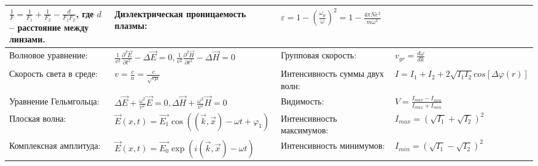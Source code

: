 \documentclass{article}
\begin{document}
\begin{tabular}{ |p{4.1cm}|p{5.4cm}|p{3.9cm}|p{5.6cm}|  }
$\frac{1}{F} = \frac{1}{F_1} + \frac{1}{F_2} - \frac{d}{F_1 F_2}$,
где $d$ -- расстояние между линзами.                                         &  %
Диэлектрическая проницаемость плазмы:                                        &  %
$\varepsilon = 1 - (\frac{\omega_p}{\omega})^2 =
 1 - \frac{4 \pi N e^2}{m \omega^2}$                                         \\ %
\hline
Волновое уравнение:                                                          &  %
$\frac{1}{v^2} \frac{\partial^2 \vec{E}}{\partial t^2} - \Delta \vec{E} = 0,
\frac{1}{v^2} \frac{\partial^2 \vec{H}}{\partial t^2} - \Delta \vec{H} = 0$  &  %
Групповая скорость:                                                          &  %
$v_{gr} = \frac{d \omega}{d k}$                                                 \\ %
\hline
Скорость света в среде:                                                      &  %
$v = \frac{c}{n} = \frac{c}{\sqrt{\varepsilon\mu}}$                          &  %
Интенсивность суммы двух волн:                                               &  %
$I = I_1 + I_2 + 2 \sqrt{I_1 I_2} cos [\Delta \varphi(r)]$                                       \\ %
\hline
Уравнение Гельмгольца:                                                       &  %
$\Delta \vec{E} + \frac{\omega^2}{v^2} \vec{E} = 0,
\Delta \vec{H} + \frac{\omega^2}{v^2} \vec{H} = 0$                           &  %
Видимость:                                                                   &  %
$V = \frac{I_{max} - I_{min}}{I_{max} + I_{min}}$                                                     \\ %
\hline
Плоская волна:                                                               &  %
$\vec{E}(x, t) = \vec{E_1} \cos((\vec{k}, \vec{x}) - \omega t + \varphi_1)$  &  %
Интенсивность максимумов:                                                    &  %
$I_{max} = (\sqrt{I_1} + \sqrt{I_2})^2$                                      \\ %
\hline
Комплексная амплитуда:                                                       &  %
$\vec{E}(x, t) = \vec{E_0} \exp(i(\vec{k}, \vec{x}) - \omega t)$             &  %
Интенсивность минимумов:                                                     &  %
$I_{min} = (\sqrt{I_1} - \sqrt{I_2})^2$                                      \\ %

\end{tabular}
\end{document}
